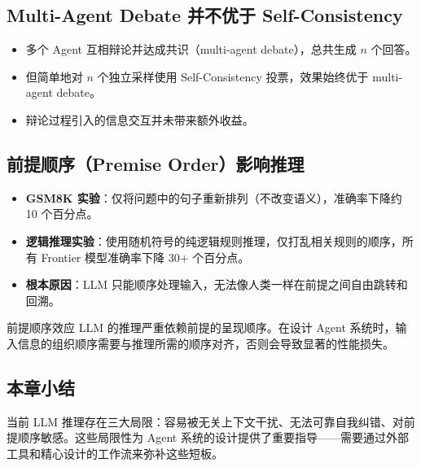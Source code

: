 \subsection{Multi-Agent Debate 并不优于 Self-Consistency}

\begin{itemize}
    \item 多个 Agent 互相辩论并达成共识（multi-agent debate），总共生成 $n$ 个回答。
    \item 但简单地对 $n$ 个独立采样使用 Self-Consistency 投票，效果始终优于 multi-agent debate。
    \item 辩论过程引入的信息交互并未带来额外收益。
\end{itemize}

\subsection{前提顺序（Premise Order）影响推理}

\begin{itemize}
    \item \textbf{GSM8K 实验}：仅将问题中的句子重新排列（不改变语义），准确率下降约 10 个百分点。
    \item \textbf{逻辑推理实验}：使用随机符号的纯逻辑规则推理，仅打乱相关规则的顺序，所有 Frontier 模型准确率下降 30+ 个百分点。
    \item \textbf{根本原因}：LLM 只能顺序处理输入，无法像人类一样在前提之间自由跳转和回溯。
\end{itemize}

\begin{warningbox}{前提顺序效应}
LLM 的推理严重依赖前提的呈现顺序。在设计 Agent 系统时，输入信息的组织顺序需要与推理所需的顺序对齐，否则会导致显著的性能损失。
\end{warningbox}

\subsection{本章小结}

当前 LLM 推理存在三大局限：容易被无关上下文干扰、无法可靠自我纠错、对前提顺序敏感。这些局限性为 Agent 系统的设计提供了重要指导——需要通过外部工具和精心设计的工作流来弥补这些短板。

